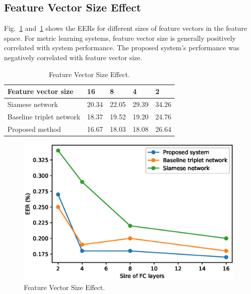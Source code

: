 \subsection{Feature Vector Size Effect}
Fig.~\ref{fclayer} and~\ref{tab_feature_vectors} shows the EERs for different sizes of feature vectors in the feature space. 
For metric learning systems, feature vector size is generally positively correlated with system performance.
The proposed system's performance was negatively correlated with feature vector size.
\begin{table}[]
    \caption{Feature Vector Size Effect.}\label{tab_feature_vectors}
    \centering
    \begin{tabular}{|l|l|l|l|l|}
    \hline
    Feature vector size        & 16    & 8     & 4     & 2     \\ \hline
    Siamese network            & 20.34 & 22.05 & 29.39 & 34.26 \\ \hline
    Baseline triplet network   & 18.37 & 19.52 & 19.20 & 24.76 \\ \hline
    Proposed method            & 16.67 & 18.03 & 18.08 & 26.64 \\ \hline
    \end{tabular}
\end{table}
\begin{figure}[!ht]
    \includegraphics[width=\textwidth]{fclayer_v1.eps}
    \caption{Feature Vector Size Effect.} \label{fclayer}
\end{figure}
\iffalse
